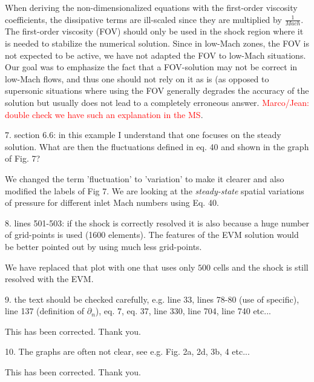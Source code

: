 \documentclass{article}
\newcommand{\tcr}[1]{\textcolor{red}{#1}}
\begin{document}
When deriving the non-dimensionalized equations with the first-order viscosity coefficients, the dissipative terms are ill-scaled since they are multiplied by $\frac{1}{Mach}$. The first-order viscosity (FOV) should only be used in the shock region where it is needed to stabilize the numerical solution. Since in low-Mach zones, the FOV is not expected to be active, we have not adapted the FOV to low-Mach situations. Our goal was to emphasize the fact that a FOV-solution may not be correct in low-Mach flows, and thus one should not rely on it as is (as opposed to supersonic situations where using the FOV generally degrades the accuracy of the solution but usually does not lead to a completely erroneous answer. \tcr{Marco/Jean: double check we have such an explanation in the MS}.
\bigskip


{
\color{blue}
7. section 6.6: in this example I understand that one focuses on the steady solution. What are then the fluctuations defined in eq. 40 and shown in the graph of Fig. 7?
}

We changed the term 'fluctuation' to 'variation' to make it clearer and also modified the labels of Fig 7. We are looking at the \emph{steady-state} spatial variations of pressure for different inlet Mach numbers using Eq. 40.
\bigskip


{
\color{blue}
8. lines 501-503: if the shock is correctly resolved it is also because a huge number of grid-points is used (1600 elements). The features  of the EVM solution would be better pointed out by using much less grid-points.
}

We have replaced that plot with one that uses only $500$ cells and the shock is still resolved with the EVM.
\bigskip


{
\color{blue}
9. the text should be checked carefully, e.g. line 33, lines 78-80 (use of specific), line 137 (definition of $\partial_n$), eq. 7, eq. 37, line 330, line 704, line 740 etc...
}

This has been corrected. Thank you.
\bigskip


{
\color{blue}
10. The graphs are often not clear, see e.g. Fig. 2a, 2d, 3b, 4 etc...
}

This has been corrected. Thank you.
\bigskip
\end{document}
